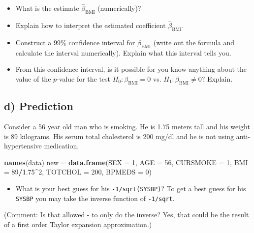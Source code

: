 \documentclass[]{article}
\newenvironment{Shaded}{\begin{snugshade}}{\end{snugshade}}
\newcommand{\KeywordTok}[1]{\textcolor[rgb]{0.13,0.29,0.53}{\textbf{#1}}}
\newcommand{\DataTypeTok}[1]{\textcolor[rgb]{0.13,0.29,0.53}{#1}}
\newcommand{\DecValTok}[1]{\textcolor[rgb]{0.00,0.00,0.81}{#1}}
\newcommand{\FloatTok}[1]{\textcolor[rgb]{0.00,0.00,0.81}{#1}}
\newcommand{\StringTok}[1]{\textcolor[rgb]{0.31,0.60,0.02}{#1}}
\newcommand{\OperatorTok}[1]{\textcolor[rgb]{0.81,0.36,0.00}{\textbf{#1}}}
\newcommand{\NormalTok}[1]{#1}
\providecommand{\tightlist}{%
  \setlength{\itemsep}{0pt}\setlength{\parskip}{0pt}}
\begin{document}
\begin{itemize}
\tightlist
\item
  What is the estimate \(\hat{\beta}_{\text{BMI}}\) (numerically)?
\item
  Explain how to interpret the estimated coefficient
  \(\hat{\beta}_{\text{BMI}}\).
\item
  Construct a 99\% confidence interval for \(\beta_{\text{BMI}}\) (write
  out the formula and calculate the interval numerically). Explain what
  this interval tells you.
\item
  From this confidence interval, is it possible for you know anything
  about the value of the \(p\)-value for the test
  \(H_0: \beta_{\text{BMI}}=0\) vs. \(H_1:\beta_{\text{BMI}} \neq 0\)?
  Explain.
\end{itemize}

\subsection{d) Prediction}\label{d-prediction}

Consider a 56 year old man who is smoking. He is 1.75 meters tall and
his weight is 89 kilograms. His serum total cholesterol is 200 mg/dl and
he is not using anti-hypertensive medication.

\begin{Shaded}
\begin{Highlighting}[]
\KeywordTok{names}\NormalTok{(data)}
\NormalTok{new =}\StringTok{ }\KeywordTok{data.frame}\NormalTok{(}\DataTypeTok{SEX =} \DecValTok{1}\NormalTok{, }\DataTypeTok{AGE =} \DecValTok{56}\NormalTok{, }\DataTypeTok{CURSMOKE =} \DecValTok{1}\NormalTok{, }\DataTypeTok{BMI =} \DecValTok{89}\OperatorTok{/}\FloatTok{1.75}\OperatorTok{^}\DecValTok{2}\NormalTok{, }\DataTypeTok{TOTCHOL =} \DecValTok{200}\NormalTok{, }
    \DataTypeTok{BPMEDS =} \DecValTok{0}\NormalTok{)}
\end{Highlighting}
\end{Shaded}

\begin{itemize}
\tightlist
\item
  What is your best guess for his \texttt{-1/sqrt(SYSBP)}? To get a best
  guess for his \texttt{SYSBP} you may take the inverse function of
  \texttt{-1/sqrt}.
\end{itemize}

(Comment: Is that allowed - to only do the inverse? Yes, that could be
the result of a first order Taylor expansion approximation.)
\end{document}

